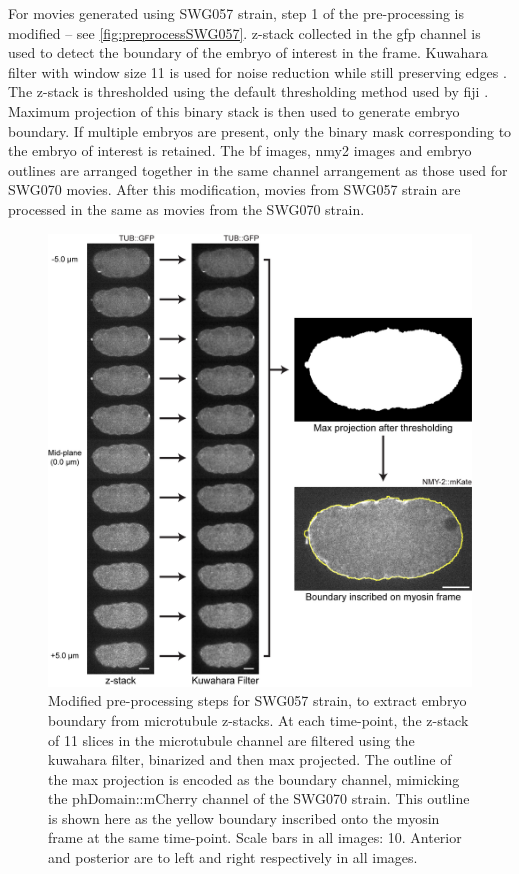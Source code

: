For movies generated using SWG057 strain, step 1 of the pre-processing is modified --  see \autoref{fig:preprocessSWG057}. z-stack collected in the \ac{gfp} channel is used to detect the boundary of the embryo of interest in the frame. Kuwahara filter with window size \num{11} is used for noise reduction while still preserving edges \citep{kuwahara1976processing}. The z-stack is thresholded using the default thresholding method used by \ac{fiji} \citep{imageJGuide}. Maximum projection of this binary stack is then used to generate embryo boundary. If multiple embryos are present, only the binary mask corresponding to the embryo of interest is retained. The \ac{bf} images, \ac{nmy2} images and embryo outlines are arranged together in the same channel arrangement as those used for SWG070 movies. After this modification, movies from SWG057 strain are processed in the same as movies from the SWG070 strain.

\begin{figure}[h]
\centering
\includegraphics[width=\textwidth]{ExpMethods/FigPreProcess/swg057BoundaryDetect.png}
\caption[Image analysis: pre-processing (SWG057)]{Modified pre-processing steps for SWG057 strain, to extract embryo boundary from microtubule z-stacks. At each time-point, the z-stack of \num{11} slices in the microtubule channel are filtered using the kuwahara filter, binarized and then max projected. The outline of the max projection is encoded as the boundary channel, mimicking the phDomain::mCherry channel of the SWG070 strain. This outline is shown here as the yellow boundary inscribed onto the myosin frame at the same time-point. Scale bars in all images: \SI{10}{\unitLength}. Anterior and posterior are to left and right respectively in all images.}
\label{fig:preprocessSWG057}
\end{figure}

